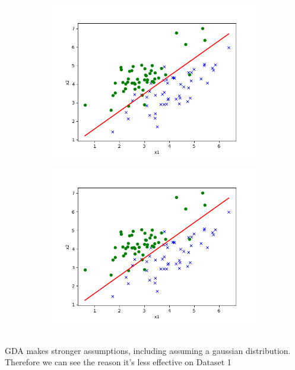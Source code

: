 \begin{answer}
    \begin{figure}[htbp]
        \begin{subfigure}[b]{0.5\linewidth}
            \centering
            \includegraphics[width=\linewidth]{../src/output/p01b_pred_2.png}
        \end{subfigure}
        \begin{subfigure}[b]{0.5\linewidth}
            \centering
            \includegraphics[width=\linewidth]{../src/output/p01e_pred_2.png}
        \end{subfigure}
    \end{figure}
    \\GDA makes stronger assumptions, including assuming a gaussian distribution.\\
    Therefore we can see the reason it's less effective on Dataset 1
\end{answer}
